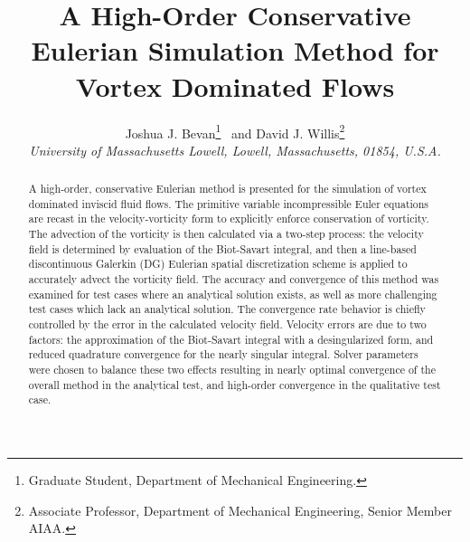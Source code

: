\documentclass[]{aiaa-tc}%
\title{A High-Order Conservative Eulerian Simulation Method for Vortex Dominated Flows}
\author{
Joshua J. Bevan\thanks{Graduate Student, Department of Mechanical Engineering.}
\ and David J. Willis\thanks{Associate Professor, Department of Mechanical Engineering, Senior Member AIAA.}\\
{\normalsize\itshape
 University of Massachusetts Lowell, Lowell, Massachusetts, 01854, U.S.A.}\\
 }
\begin{document}
\maketitle

\begin{abstract}
A high-order, conservative Eulerian method is presented for the simulation of vortex dominated inviscid fluid flows. The primitive variable incompressible Euler equations are recast in the velocity-vorticity form to explicitly enforce conservation of vorticity. The advection of the vorticity is then calculated via a two-step process: the velocity field is determined by evaluation of the Biot-Savart integral, and then a line-based discontinuous Galerkin (DG) Eulerian spatial discretization scheme is applied to accurately advect the vorticity field. The accuracy and convergence of this method was examined for test cases where an analytical solution exists, as well as more challenging test cases which lack an analytical solution. The convergence rate behavior is chiefly controlled by the error in the calculated velocity field. Velocity errors are due to two factors: the approximation of the Biot-Savart integral with a desingularized form, and reduced quadrature convergence for the nearly singular integral. Solver parameters were chosen to balance these two effects resulting in nearly optimal convergence of the overall method in the analytical test, and high-order convergence in the qualitative test case.
\end{abstract}


\end{document}
